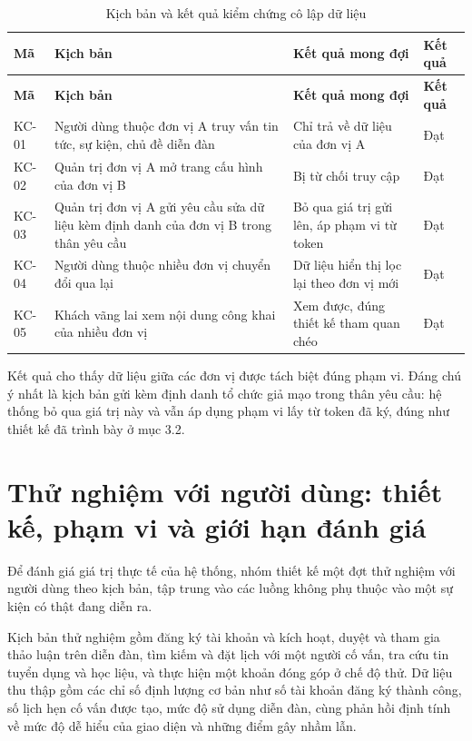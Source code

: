 \documentclass[12pt,a4paper,oneside]{report}
\begin{document}
\renewcommand{\arraystretch}{1.2}
\begin{longtable}{|>{\raggedright\arraybackslash}p{1.6cm}|>{\raggedright\arraybackslash}p{5.6cm}|>{\raggedright\arraybackslash}p{4.4cm}|>{\raggedright\arraybackslash}p{2.6cm}|}
\caption{Kịch bản và kết quả kiểm chứng cô lập dữ liệu}\label{tab:isolation}\\
\hline \textbf{Mã} & \textbf{Kịch bản} & \textbf{Kết quả mong đợi} & \textbf{Kết quả} \\ \hline
\endfirsthead
\hline \textbf{Mã} & \textbf{Kịch bản} & \textbf{Kết quả mong đợi} & \textbf{Kết quả} \\ \hline
\endhead
KC-01 & Người dùng thuộc đơn vị A truy vấn tin tức, sự kiện, chủ đề diễn đàn & Chỉ trả về dữ liệu của đơn vị A & Đạt \\ \hline
KC-02 & Quản trị đơn vị A mở trang cấu hình của đơn vị B & Bị từ chối truy cập & Đạt \\ \hline
KC-03 & Quản trị đơn vị A gửi yêu cầu sửa dữ liệu kèm định danh của đơn vị B trong thân yêu cầu & Bỏ qua giá trị gửi lên, áp phạm vi từ token & Đạt \\ \hline
KC-04 & Người dùng thuộc nhiều đơn vị chuyển đổi qua lại & Dữ liệu hiển thị lọc lại theo đơn vị mới & Đạt \\ \hline
KC-05 & Khách vãng lai xem nội dung công khai của nhiều đơn vị & Xem được, đúng thiết kế tham quan chéo & Đạt \\ \hline
\end{longtable}
\renewcommand{\arraystretch}{1}

Kết quả cho thấy dữ liệu giữa các đơn vị được tách biệt đúng phạm vi. Đáng chú ý nhất là kịch bản gửi kèm định danh tổ chức giả mạo trong thân yêu cầu: hệ thống bỏ qua giá trị này và vẫn áp dụng phạm vi lấy từ token đã ký, đúng như thiết kế đã trình bày ở mục 3.2.

\section{Thử nghiệm với người dùng: thiết kế, phạm vi và giới hạn đánh giá}

Để đánh giá giá trị thực tế của hệ thống, nhóm thiết kế một đợt thử nghiệm với người dùng theo kịch bản, tập trung vào các luồng không phụ thuộc vào một sự kiện có thật đang diễn ra.

Kịch bản thử nghiệm gồm đăng ký tài khoản và kích hoạt, duyệt và tham gia thảo luận trên diễn đàn, tìm kiếm và đặt lịch với một người cố vấn, tra cứu tin tuyển dụng và học liệu, và thực hiện một khoản đóng góp ở chế độ thử. Dữ liệu thu thập gồm các chỉ số định lượng cơ bản như số tài khoản đăng ký thành công, số lịch hẹn cố vấn được tạo, mức độ sử dụng diễn đàn, cùng phản hồi định tính về mức độ dễ hiểu của giao diện và những điểm gây nhầm lẫn.
\end{document}
